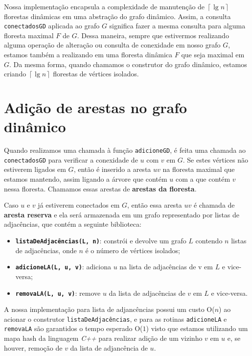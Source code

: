 Nossa implementação encapsula a complexidade de manutenção de $\left\lceil \lg n \right\rceil$ florestas dinâmicas em uma abstração do grafo dinâmico. 
Assim, a consulta \texttt{conectadosGD} aplicada ao grafo $G$ significa fazer a mesma consulta para alguma floresta maximal $F$ de $G$. Dessa maneira, sempre que estivermos realizando alguma operação de alteração ou consulta de conexidade em nosso grafo $G$, estamos também a realizando em uma floresta dinâmica $F$ que seja maximal em $G$. Da mesma forma, quando chamamos o construtor do grafo dinâmico, estamos criando $\left\lceil \lg n \right\rceil$ florestas de vértices isolados.

\section{Adição de arestas no grafo dinâmico}

Quando realizamos uma chamada à função \texttt{adicioneGD}, é feita uma chamada ao \texttt{conectadosGD} para verificar a conexidade de $u$ com $v$ em $G$. Se estes vértices não estiverem ligados em $G$, então é inserido a aresta $uv$ na floresta maximal que estamos mantendo, assim ligando a árvore que contém $u$ com a que contém $v$ nessa floresta. Chamamos essas arestas de \textbf{arestas da floresta}.

Caso $u$ e $v$ já estiverem conectados em $G$, então essa aresta $uv$ é chamada de \textbf{aresta reserva} e ela será armazenada em um grafo representado por listas de adjacências, que contém a seguinte biblioteca:

\begin{itemize}
    \item \texttt{\textbf{listaDeAdjacências(L, n)}}: constrói e devolve um grafo $L$ contendo $n$ listas de adjacências, onde $n$ é o número de vértices isolados;
    \item \texttt{\textbf{adicioneLA(L, u, v)}}: adiciona $u$ na lista de adjacências de v em $L$ e vice-versa;
    \item \texttt{\textbf{removaLA(L, u, v)}}: remove $u$ da lista de adjacências de $v$ em $L$ e vice-versa.
\end{itemize} 

A nossa implementação \cite{chung2025} para lista de adjancências possui um custo O($n$) ao acionar o construtor \texttt{listaDeAdjacências}, e para 
as rotinas \texttt{adicioneLA} e \texttt{removaLA} são garantidos o tempo esperado O($1$) visto que estamos utilizando um mapa hash da linguagem \textit{C++} para realizar adição de um vizinho $v$ em $u$ e, se houver, remoção de $v$ da lista de adjancência de $u$.

